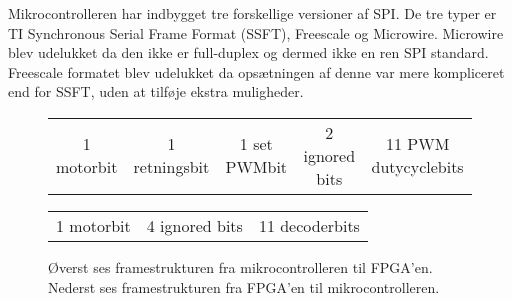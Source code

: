 Mikrocontrolleren har indbygget tre forskellige versioner af SPI. De tre typer er TI Synchronous Serial Frame Format (SSFT), Freescale og Microwire. 
Microwire blev udelukket da den ikke er full-duplex og dermed ikke en ren SPI standard. 
Freescale formatet blev udelukket da opsætningen af denne var mere kompliceret end for SSFT, uden at tilføje ekstra muligheder.


\begin{figure}[th!]
\centering
\begin{tabular}{c|c|c|c|c}
1 motorbit &1 retningsbit & 1 set PWMbit & 2 ignored bits & 11 PWM dutycyclebits\\
\end{tabular}
 \begin{tabular}{c|c|c}
 1 motorbit & 4 ignored bits & 11 decoderbits
 \end{tabular}
\captionsetup{type=figure}
\caption[SPI framestruktur]{Øverst ses framestrukturen fra mikrocontrolleren til FPGA'en. Nederst ses framestrukturen fra FPGA'en til mikrocontrolleren.}
\label{tb:protokol1}
\end{figure}



